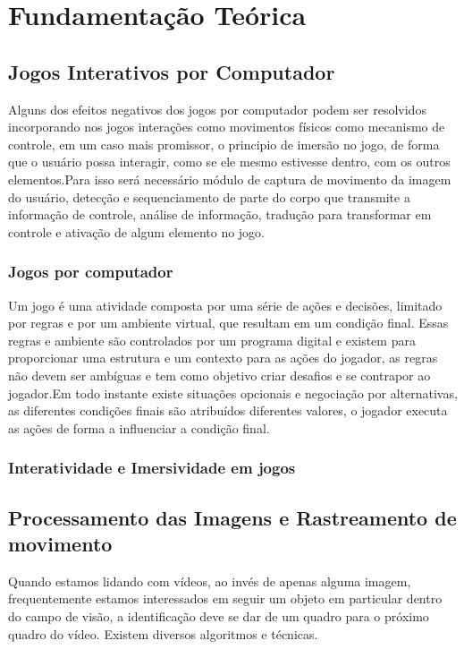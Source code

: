 \chapter{Fundamentação Teórica}

\section{Jogos Interativos por Computador}

Alguns dos efeitos negativos dos jogos por computador podem ser resolvidos
incorporando nos jogos interações como movimentos físicos como mecanismo de
controle, em um caso mais promissor, o principio de imersão no jogo, de forma que
o usuário possa interagir, como se ele mesmo estivesse dentro, com os outros
elementos.Para isso será necessário módulo de captura de movimento da imagem do
usuário, detecção e sequenciamento de parte do corpo que transmite a informação
de controle, análise de informação, tradução para transformar em controle e
ativação de algum elemento no jogo.

\subsection{Jogos por computador}

Um jogo é uma atividade composta por uma série de ações e decisões, limitado por
regras e por um ambiente virtual, que resultam em um condição final.
Essas regras e ambiente são controlados por um programa digital e existem para
proporcionar uma estrutura e um contexto para as ações do jogador, as regras
não devem ser ambíguas e tem como objetivo criar desafios e se contrapor ao
jogador.Em todo instante existe situações opcionais e negociação por
alternativas, as diferentes condições finais são atribuídos diferentes valores,
o jogador executa as ações de forma a influenciar a condição final.\cite{DesignGames}

\subsection{Interatividade e Imersividade em jogos}

\section{Processamento das Imagens e Rastreamento de movimento}

Quando estamos lidando com vídeos, ao invés de apenas alguma imagem,
frequentemente estamos interessados em seguir um objeto em particular
dentro do campo de visão, a identificação deve se dar de um quadro para
o próximo quadro do vídeo. Existem diversos algoritmos e técnicas.

